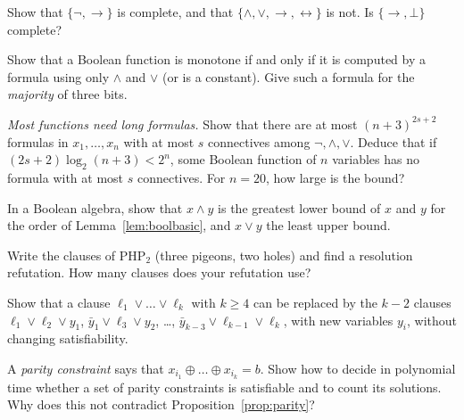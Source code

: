 \begin{exercise}[$\star$]\label{ex:connectives}
Show that $\{\neg,\to\}$ is complete, and that $\{\land,\lor,\to,\leftrightarrow\}$ is not. Is $\{\to,\bot\}$ complete?
\end{exercise}

\begin{exercise}[$\star\star$]\label{ex:monotone}
Show that a Boolean function is monotone if and only if it is computed by a formula using only $\land$ and $\lor$ (or is a
constant). Give such a formula for the \emph{majority} of three bits.
\end{exercise}

\begin{exercise}[$\star\star$]\label{ex:shannoncount}
\emph{Most functions need long formulas.} Show that there are at most $(n+3)^{2s+2}$ formulas in $x_1,\dots,x_n$ with at most $s$
connectives among $\neg,\land,\lor$. Deduce that if $(2s+2)\log_2(n+3)<2^n$, some Boolean function of $n$ variables has no formula with at
most $s$ connectives. For $n=20$, how large is the bound?
\end{exercise}

\begin{exercise}[$\star$]\label{ex:lattice}
In a Boolean algebra, show that $x\land y$ is the greatest lower bound of $x$ and $y$ for the order of Lemma~\ref{lem:boolbasic}, and
$x\lor y$ the least upper bound.
\end{exercise}

\begin{exercise}[$\star\star$]\label{ex:php}
Write the clauses of $\mathrm{PHP}_2$ (three pigeons, two holes) and find a resolution refutation. How many clauses does your
refutation use?
\end{exercise}

\begin{exercise}[$\star$]\label{ex:threesat}
Show that a clause $\ell_1\lor\dots\lor\ell_k$ with $k\ge4$ can be replaced by the $k-2$ clauses
$\ell_1\lor\ell_2\lor y_1$, $\bar y_1\lor\ell_3\lor y_2$, \dots, $\bar y_{k-3}\lor\ell_{k-1}\lor\ell_k$, with new variables $y_i$, without changing satisfiability.
\end{exercise}

\begin{exercise}[$\star\star$]\label{ex:xorsat}
A \emph{parity constraint} says that $x_{i_1}\oplus\dots\oplus x_{i_k}=b$. Show how to decide in polynomial time whether a set of parity
constraints is satisfiable and to count its solutions. Why does this not contradict Proposition~\ref{prop:parity}?
\end{exercise}

